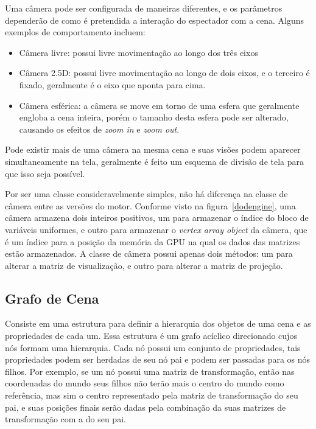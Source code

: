 Uma câmera pode ser configurada de maneiras diferentes, e os parâmetros dependerão de 
como é pretendida a interação do espectador com a cena. Alguns exemplos de 
comportamento incluem:
\begin{itemize}
    \item Câmera livre: possui livre movimentação ao longo dos três eixos
    \item Câmera 2.5D: possui livre movimentação ao longo de dois eixos, e o terceiro 
        é fixado, geralmente é o eixo que aponta para cima.
    \item Câmera esférica: a câmera se move em torno de uma esfera que geralmente 
        engloba a cena inteira, porém o tamanho desta esfera pode ser alterado, 
        causando os efeitos de \textit{zoom in} e \textit{zoom out}.
\end{itemize}

Pode existir mais de uma câmera na mesma cena e suas visões podem aparecer 
simultaneamente na tela, geralmente é feito um esquema de divisão de tela para que isso 
seja possível.

Por ser uma classe consideravelmente simples, não há diferença na classe de câmera 
entre as versões do motor. Conforme visto na figura~\ref{dodengine}, uma câmera 
armazena dois inteiros positivos, um para armazenar o índice do bloco de variáveis 
uniformes, e outro para armazenar o \textit{vertex array object} da câmera, que é 
um índice para a posição da memória da GPU na qual os dados das matrizes estão 
armazenados. A classe de câmera possui apenas dois métodos: um para alterar a matriz 
de visualização, e outro para alterar a matriz de projeção.

\subsection{Grafo de Cena}
\label{scenegraphsection}

Consiste em uma estrutura para definir a hierarquia dos objetos de uma cena e as 
propriedades de cada um. Essa estrutura é um grafo acíclico direcionado cujos nós 
formam uma hierarquia. Cada 
nó possui um conjunto de propriedades, tais propriedades podem ser herdadas de seu 
nó pai e podem ser passadas para os nós filhos. Por exemplo, se um nó possui uma 
matriz de transformação, então nas coordenadas do mundo seus filhos não terão mais o 
centro do mundo como referência, mas sim o centro representado pela matriz de 
transformação do seu pai, e suas posições finais serão dadas pela combinação da suas 
matrizes de transformação com a do seu pai.

